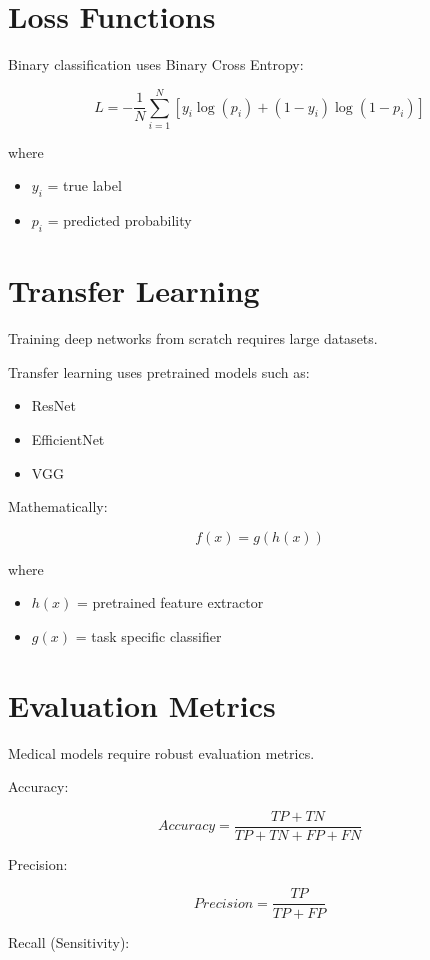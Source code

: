 ﻿\documentclass[11pt]{article}
\begin{document}
\section{Loss Functions}

Binary classification uses Binary Cross Entropy:

\[
L = -\frac{1}{N} \sum_{i=1}^{N} [y_i \log(p_i) + (1-y_i)\log(1-p_i)]
\]

where

\begin{itemize}
\item $y_i$ = true label
\item $p_i$ = predicted probability
\end{itemize}

\section{Transfer Learning}

Training deep networks from scratch requires large datasets.

Transfer learning uses pretrained models such as:

\begin{itemize}
\item ResNet
\item EfficientNet
\item VGG
\end{itemize}

Mathematically:

\[
f(x) = g(h(x))
\]

where

\begin{itemize}
\item $h(x)$ = pretrained feature extractor
\item $g(x)$ = task specific classifier
\end{itemize}

\section{Evaluation Metrics}

Medical models require robust evaluation metrics.

Accuracy:

\[
Accuracy = \frac{TP + TN}{TP + TN + FP + FN}
\]

Precision:

\[
Precision = \frac{TP}{TP + FP}
\]

Recall (Sensitivity):
\end{document}
